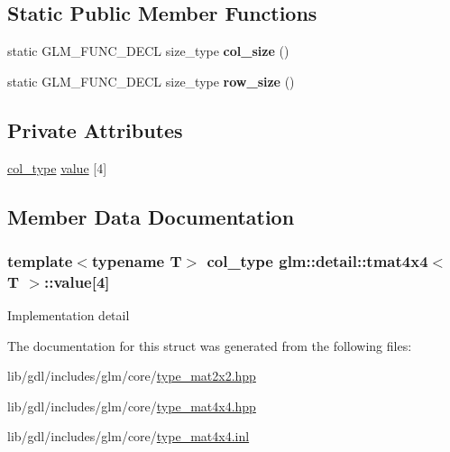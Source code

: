 \subsection*{Static Public Member Functions}
\begin{DoxyCompactItemize}
\item 
\hypertarget{structglm_1_1detail_1_1tmat4x4_a57091662d941e6be38879601c7a86b7a}{}static G\+L\+M\+\_\+\+F\+U\+N\+C\+\_\+\+D\+E\+C\+L size\+\_\+type {\bfseries col\+\_\+size} ()\label{structglm_1_1detail_1_1tmat4x4_a57091662d941e6be38879601c7a86b7a}

\item 
\hypertarget{structglm_1_1detail_1_1tmat4x4_a7c94ace6f65d34db4e01b21148a92d82}{}static G\+L\+M\+\_\+\+F\+U\+N\+C\+\_\+\+D\+E\+C\+L size\+\_\+type {\bfseries row\+\_\+size} ()\label{structglm_1_1detail_1_1tmat4x4_a7c94ace6f65d34db4e01b21148a92d82}

\end{DoxyCompactItemize}
\subsection*{Private Attributes}
\begin{DoxyCompactItemize}
\item 
\hyperlink{structglm_1_1detail_1_1tvec4}{col\+\_\+type} \hyperlink{structglm_1_1detail_1_1tmat4x4_af0f3d319eab32a035d7659dec35371fa}{value} \mbox{[}4\mbox{]}
\end{DoxyCompactItemize}


\subsection{Member Data Documentation}
\hypertarget{structglm_1_1detail_1_1tmat4x4_af0f3d319eab32a035d7659dec35371fa}{}
\subsubsection[{value}]{\setlength{\rightskip}{0pt plus 5cm}template$<$typename T$>$ {\bf col\+\_\+type} {\bf glm\+::detail\+::tmat4x4}$<$ T $>$\+::value\mbox{[}4\mbox{]}\hspace{0.3cm}{\ttfamily [private]}}\label{structglm_1_1detail_1_1tmat4x4_af0f3d319eab32a035d7659dec35371fa}
Implementation detail 

The documentation for this struct was generated from the following files\+:\begin{DoxyCompactItemize}
\item 
lib/gdl/includes/glm/core/\hyperlink{type__mat2x2_8hpp}{type\+\_\+mat2x2.\+hpp}\item 
lib/gdl/includes/glm/core/\hyperlink{type__mat4x4_8hpp}{type\+\_\+mat4x4.\+hpp}\item 
lib/gdl/includes/glm/core/\hyperlink{type__mat4x4_8inl}{type\+\_\+mat4x4.\+inl}\end{DoxyCompactItemize}
